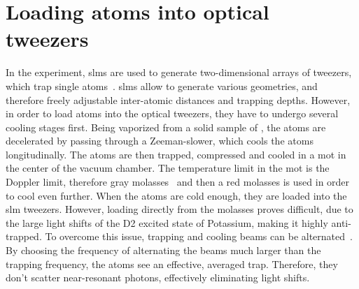 \chapter{Loading atoms into optical tweezers}%
\label{ch:chopping}


In the experiment, \acp{slm} are used to generate two-dimensional arrays of tweezers, which trap single atoms~\cite{Osterholz2020}. \acp{slm} allow to generate various geometries, and therefore freely adjustable inter-atomic distances and trapping depths. However, in order to load atoms into the optical tweezers, they have to undergo several cooling stages first. Being vaporized from a solid sample of , the atoms are decelerated by passing through a Zeeman-slower, which cools the atoms longitudinally. The atoms are then trapped, compressed and cooled in a \ac{mot} in the center of the vacuum chamber. The temperature limit in the \ac{mot} is the Doppler limit, therefore gray molasses~\cite{Salomon2013} and then a red molasses is used in order to cool even further. When the atoms are cold enough, they are loaded into the \ac{slm} tweezers. However, loading directly from the molasses proves difficult, due to the large light shifts of the D2 excited state of Potassium, making it highly anti-trapped. To overcome this issue, trapping and cooling beams can be alternated~\cite{Hutzler2017}. By choosing the frequency of alternating the beams much larger than the trapping frequency, the atoms see an effective, averaged trap. Therefore, they don't scatter near-resonant photons, effectively eliminating light shifts.

